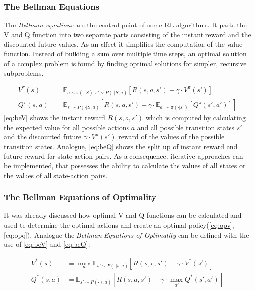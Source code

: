 \newpage

\subsubsection{The Bellman Equations}
The \emph{Bellman equations} are the central point of some RL algorithms. It parts the V and Q function into two
separate parts consisting of the instant reward and the discounted future values. As an effect it simplifies the computation of the value function. 
Instead of building a sum over multiple time steps, an optimal solution of a complex problem is found by finding optimal solutions for simpler, recursive subproblems.

\begin{align}
	V^{\pi} (s) &= \mathbb{E}_{a \sim \pi (\cdot | S), s' \sim P(\cdot | S,a)} [R(s,a,s') + \gamma \cdot V^{\pi}(s')] \label{eq:beV} \\
	Q^{\pi} (s,a) &= \mathbb{E}_{s' \sim P(\cdot |S,a)} [R(s,a,s') + \gamma \cdot  \mathbb{E}_{a' \sim \pi (\cdot | s')}[Q^{\pi}(s',a')]] \label{eq:beQ}
\end{align}
\newline
\cref{eq:beV} shows the instant reward $R(s,a,s')$ which is computed by calculating the expected value for all possible actions $a$ and all possible transition states $s'$ and the discounted future $\gamma \cdot V^{\pi} (s')$ reward of the values of the possible transition states. Analogue, \cref{eq:beQ} shows the split up of instant reward and future reward for state-action pairs. As a consequence, iterative approaches can be implemented, that possesses the ability to calculate the values of all states or the values of all state-action pairs. 

\subsubsection{The Bellman Equations of Optimality}
It was already discussed how optimal V and Q functions can be calculated and used to determine the optimal actions 
and create an optimal policy(\cref{eq:opv}, \cref{eq:opq}). 
Analogue the \emph{Bellman Equations of Optimality} can be defined with the use of \cref{eq:beV} and \cref{eq:beQ}:

\begin{align}
	V^*(s)  &= \max_a \mathbb{E}_{s' \sim P(\cdot | s,a)} [R(s,a,s') + \gamma \cdot V^*(s')] \label{eq:bopV}\\
	Q^*(s,a) &= \mathbb{E}_{s' \sim P(\cdot | s,a)} [R(s,a,s') + \gamma \cdot \max_{a'} Q^*(s',a')] \label{eq:bopQ}
\end{align}

